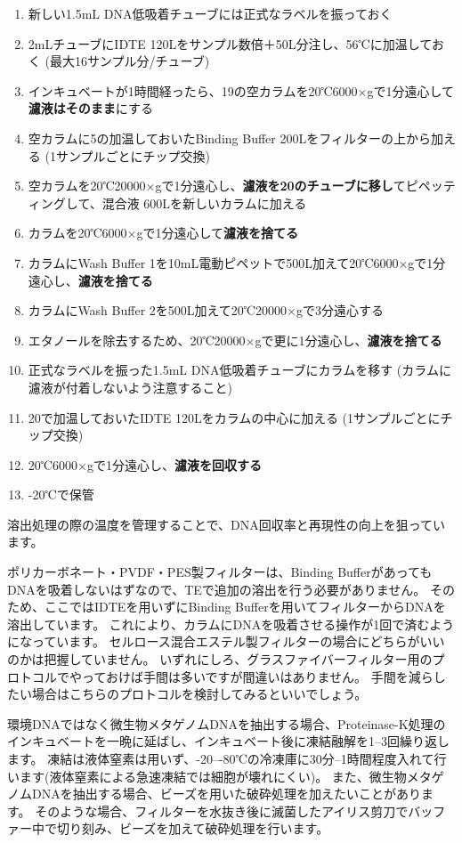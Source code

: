\documentclass[titlepage,10pt,a4paper,uplatex]{jsbook}
\renewcommand{\textbf}[1]{{\bfseries\sffamily#1}}
\begin{document}
\begin{enumerate}
\item 新しい1.5mL DNA低吸着チューブには正式なラベルを振っておく
\item 2mLチューブにIDTE 120{\textmu}Lをサンプル数倍＋50{\textmu}L分注し、56℃に加温しておく (最大16サンプル分/チューブ)
\item インキュベートが1時間経ったら、19の空カラムを20℃6000×gで1分遠心して\textbf{濾液はそのまま}にする
\item 空カラムに5の加温しておいたBinding Buffer 200{\textmu}Lをフィルターの上から加える (1サンプルごとにチップ交換)
\item 空カラムを20℃20000×gで1分遠心し、\textbf{濾液を20のチューブに移し}てピペッティングして、混合液 600{\textmu}Lを新しいカラムに加える
\item カラムを20℃6000×gで1分遠心して\textbf{濾液を捨てる}
\item カラムにWash Buffer 1を10mL電動ピペットで500{\textmu}L加えて20℃6000×gで1分遠心し、\textbf{濾液を捨てる}
\item カラムにWash Buffer 2を500{\textmu}L加えて20℃20000×gで3分遠心する
\item エタノールを除去するため、20℃20000×gで更に1分遠心し、\textbf{濾液を捨てる}
\item 正式なラベルを振った1.5mL DNA低吸着チューブにカラムを移す (カラムに濾液が付着しないよう注意すること)
\item 20で加温しておいたIDTE 120{\textmu}Lをカラムの中心に加える (1サンプルごとにチップ交換)
\item 20℃6000×gで1分遠心し、\textbf{濾液を回収する}
\item -20℃で保管
\end{enumerate}

溶出処理の際の温度を管理することで、DNA回収率と再現性の向上を狙っています。

ポリカーボネート・PVDF・PES製フィルターは、Binding BufferがあってもDNAを吸着しないはずなので、TEで追加の溶出を行う必要がありません。
そのため、ここではIDTEを用いずにBinding Bufferを用いてフィルターからDNAを溶出しています。
これにより、カラムにDNAを吸着させる操作が1回で済むようになっています。
セルロース混合エステル製フィルターの場合にどちらがいいのかは把握していません。
いずれにしろ、グラスファイバーフィルター用のプロトコルでやっておけば手間は多いですが間違いはありません。
手間を減らしたい場合はこちらのプロトコルを検討してみるといいでしょう。

環境DNAではなく微生物メタゲノムDNAを抽出する場合、Proteinase-K処理のインキュベートを一晩に延ばし、インキュベート後に凍結融解を1--3回繰り返します。
凍結は液体窒素は用いず、{-20}--{-80}℃の冷凍庫に30分--1時間程度入れて行います(液体窒素による急速凍結では細胞が壊れにくい)。
また、微生物メタゲノムDNAを抽出する場合、ビーズを用いた破砕処理を加えたいことがあります。
そのような場合、フィルターを水抜き後に滅菌したアイリス剪刀でバッファー中で切り刻み、ビーズを加えて破砕処理を行います。
\end{document}
